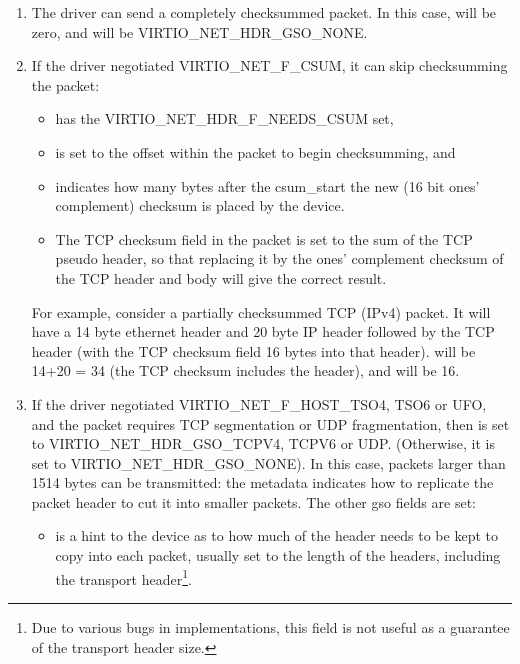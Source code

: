 \begin{enumerate}
\item The driver can send a completely checksummed packet.  In this case,
   will be zero, and  will be VIRTIO_NET_HDR_GSO_NONE.

\item If the driver negotiated VIRTIO_NET_F_CSUM, it can skip
  checksumming the packet:
  \begin{itemize}
  \item {} has the VIRTIO_NET_HDR_F_NEEDS_CSUM set,

  \item {} is set to the offset within the packet to begin checksumming,
    and

  \item {} indicates how many bytes after the csum_start the
    new (16 bit ones' complement) checksum is placed by the device.

  \item The TCP checksum field in the packet is set to the sum
    of the TCP pseudo header, so that replacing it by the ones'
    complement checksum of the TCP header and body will give the
    correct result.
  \end{itemize}

\begin{note}
For example, consider a partially checksummed TCP (IPv4) packet.
It will have a 14 byte ethernet header and 20 byte IP header
followed by the TCP header (with the TCP checksum field 16 bytes
into that header).  will be 14+20 = 34 (the TCP
checksum includes the header), and  will be 16.
\end{note}

\item If the driver negotiated
  VIRTIO_NET_F_HOST_TSO4, TSO6 or UFO, and the packet requires
  TCP segmentation or UDP fragmentation, then 
  is set to VIRTIO_NET_HDR_GSO_TCPV4, TCPV6 or UDP.
  (Otherwise, it is set to VIRTIO_NET_HDR_GSO_NONE). In this
  case, packets larger than 1514 bytes can be transmitted: the
  metadata indicates how to replicate the packet header to cut it
  into smaller packets. The other gso fields are set:

  \begin{itemize}
  \item {} is a hint to the device as to how much of the header
    needs to be kept to copy into each packet, usually set to the
    length of the headers, including the transport header\footnote{Due to various bugs in implementations, this field is not useful
as a guarantee of the transport header size.
}.


\end{itemize}
\end{enumerate}

